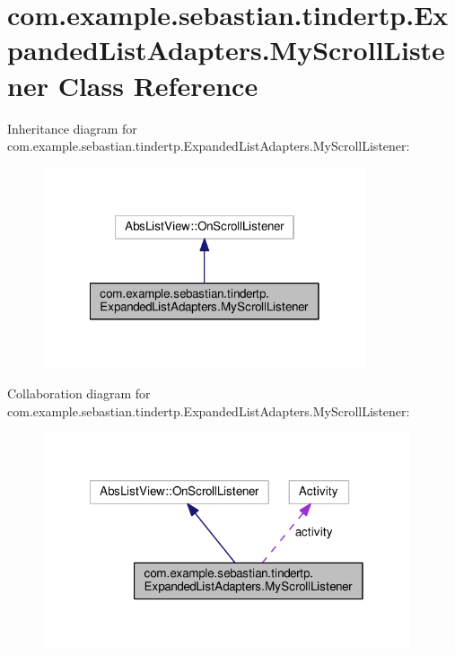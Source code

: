 \hypertarget{classcom_1_1example_1_1sebastian_1_1tindertp_1_1ExpandedListAdapters_1_1MyScrollListener}{}\section{com.\+example.\+sebastian.\+tindertp.\+Expanded\+List\+Adapters.\+My\+Scroll\+Listener Class Reference}
\label{classcom_1_1example_1_1sebastian_1_1tindertp_1_1ExpandedListAdapters_1_1MyScrollListener}


Inheritance diagram for com.\+example.\+sebastian.\+tindertp.\+Expanded\+List\+Adapters.\+My\+Scroll\+Listener\+:\nopagebreak
\begin{figure}[H]
\begin{center}
\leavevmode
\includegraphics[width=270pt]{classcom_1_1example_1_1sebastian_1_1tindertp_1_1ExpandedListAdapters_1_1MyScrollListener__inherit__graph}
\end{center}
\end{figure}


Collaboration diagram for com.\+example.\+sebastian.\+tindertp.\+Expanded\+List\+Adapters.\+My\+Scroll\+Listener\+:\nopagebreak
\begin{figure}[H]
\begin{center}
\leavevmode
\includegraphics[width=307pt]{classcom_1_1example_1_1sebastian_1_1tindertp_1_1ExpandedListAdapters_1_1MyScrollListener__coll__graph}
\end{center}
\end{figure}
